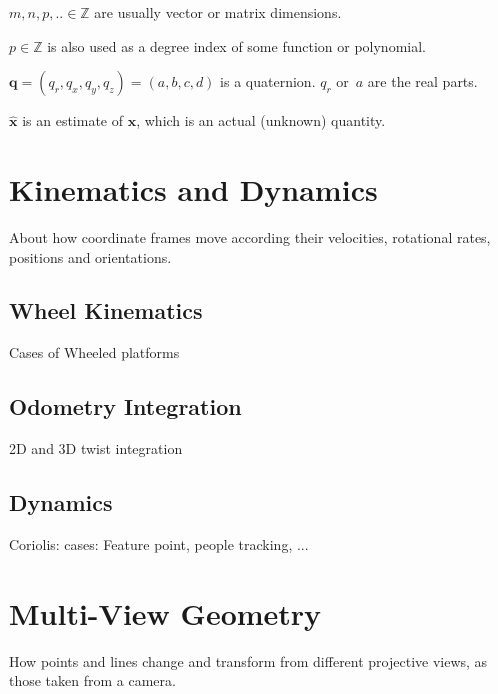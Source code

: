 \documentclass[a4paper,11pt]{article}
\begin{document}
$m,n,p,.. \in \mathbb{Z}$ are usually vector or matrix dimensions.

$p \in \mathbb{Z}$ is also used as a degree index of some function or polynomial. 

$\mathbf{q} = (q_r,q_x,q_y,q_z) = (a,b,c,d)$ is a quaternion. $q_r$ or~$a$ are the real parts.

$\hat{\mathbf{x}}$ is an estimate of $\mathbf{x}$, which is an actual (unknown) quantity.

\newpage


\newpage


\newpage


\newpage


\newpage


\newpage


\newpage


\newpage


\newpage
\section{Kinematics and Dynamics}
About how coordinate frames move according their velocities, rotational rates, positions and orientations. 

\subsection{Wheel Kinematics}
Cases of Wheeled platforms

\subsection{Odometry Integration}
2D and 3D twist integration

\subsection{Dynamics}
Coriolis: cases: Feature point, people tracking, ...

\newpage
\section{Multi-View Geometry}
How points and lines change and transform from different projective views, as those taken from a camera.
\end{document}
